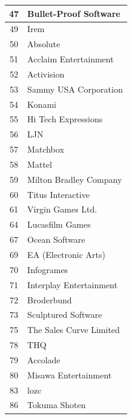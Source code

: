 \begin{longtable}{|c|l|}
47              & Bullet-Proof Software          \\ \hline
49              & Irem                           \\ \hline
50              & Absolute                       \\ \hline
51              & Acclaim Entertainment          \\ \hline
52              & Activision                     \\ \hline
53              & Sammy USA Corporation          \\ \hline
54              & Konami                         \\ \hline
55              & Hi Tech Expressions            \\ \hline
56              & LJN                            \\ \hline
57              & Matchbox                       \\ \hline
58              & Mattel                         \\ \hline
59              & Milton Bradley Company         \\ \hline
60              & Titus Interactive              \\ \hline
61              & Virgin Games Ltd.              \\ \hline
64              & Lucasfilm Games                \\ \hline
67              & Ocean Software                 \\ \hline
69              & EA (Electronic Arts)           \\ \hline
70              & Infogrames                     \\ \hline
71              & Interplay Entertainment        \\ \hline
72              & Broderbund                     \\ \hline
73              & Sculptured Software            \\ \hline
75              & The Sales Curve Limited        \\ \hline
78              & THQ                            \\ \hline
79              & Accolade                       \\ \hline
80              & Misawa Entertainment           \\ \hline
83              & lozc                           \\ \hline
86              & Tokuma Shoten                  \\ \hline

\end{longtable}
